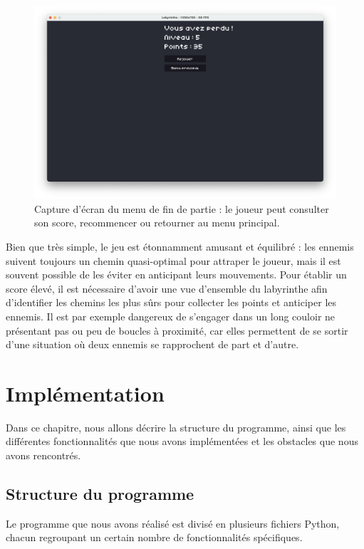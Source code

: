\documentclass[12pt]{scrreprt} %
\begin{document}
\begin{figure}[h]
    \centering
    \includegraphics[width=\textwidth]{images/loosemenu.png}
    \caption{Capture d'écran du menu de fin de partie : le joueur peut consulter son score, recommencer ou retourner au menu principal.}
\end{figure}


Bien que très simple, le jeu est étonnamment amusant et équilibré : les ennemis suivent toujours un chemin quasi-optimal pour attraper le joueur, mais il est souvent possible de les éviter en anticipant leurs mouvements. Pour établir un score élevé, il est nécessaire d'avoir une vue d'ensemble du labyrinthe afin d'identifier les chemins les plus sûrs pour collecter les points et anticiper les ennemis. Il est par exemple dangereux de s'engager dans un long couloir ne présentant pas ou peu de boucles à proximité, car elles permettent de se sortir d'une situation où deux ennemis se rapprochent de part et d'autre.

\chapter{Implémentation}

Dans ce chapitre, nous allons décrire la structure du programme, ainsi que les différentes fonctionnalités que nous avons implémentées et les obstacles que nous avons rencontrés.

\section{Structure du programme}

Le programme que nous avons réalisé est divisé en plusieurs fichiers Python, chacun regroupant un certain nombre de fonctionnalités spécifiques.
\end{document}

